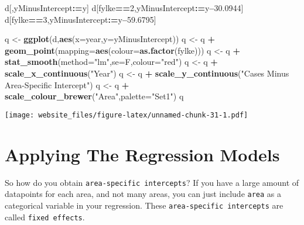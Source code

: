 \documentclass[]{book}
\newenvironment{Shaded}{\begin{snugshade}}{\end{snugshade}}
\newcommand{\KeywordTok}[1]{\textcolor[rgb]{0.13,0.29,0.53}{\textbf{#1}}}
\newcommand{\DataTypeTok}[1]{\textcolor[rgb]{0.13,0.29,0.53}{#1}}
\newcommand{\DecValTok}[1]{\textcolor[rgb]{0.00,0.00,0.81}{#1}}
\newcommand{\FloatTok}[1]{\textcolor[rgb]{0.00,0.00,0.81}{#1}}
\newcommand{\StringTok}[1]{\textcolor[rgb]{0.31,0.60,0.02}{#1}}
\newcommand{\OperatorTok}[1]{\textcolor[rgb]{0.81,0.36,0.00}{\textbf{#1}}}
\newcommand{\ErrorTok}[1]{\textcolor[rgb]{0.64,0.00,0.00}{\textbf{#1}}}
\newcommand{\NormalTok}[1]{#1}
\begin{document}
\begin{Shaded}
\begin{Highlighting}[]
\NormalTok{d[,yMinusIntercept}\OperatorTok{:}\ErrorTok{=}\NormalTok{y]}
\NormalTok{d[fylke}\OperatorTok{==}\DecValTok{2}\NormalTok{,yMinusIntercept}\OperatorTok{:}\ErrorTok{=}\NormalTok{y}\OperatorTok{--}\FloatTok{30.0944}\NormalTok{]}
\NormalTok{d[fylke}\OperatorTok{==}\DecValTok{3}\NormalTok{,yMinusIntercept}\OperatorTok{:}\ErrorTok{=}\NormalTok{y}\OperatorTok{--}\FloatTok{59.6795}\NormalTok{]}

\NormalTok{q <-}\StringTok{ }\KeywordTok{ggplot}\NormalTok{(d,}\KeywordTok{aes}\NormalTok{(}\DataTypeTok{x=}\NormalTok{year,}\DataTypeTok{y=}\NormalTok{yMinusIntercept))}
\NormalTok{q <-}\StringTok{ }\NormalTok{q }\OperatorTok{+}\StringTok{ }\KeywordTok{geom_point}\NormalTok{(}\DataTypeTok{mapping=}\KeywordTok{aes}\NormalTok{(}\DataTypeTok{colour=}\KeywordTok{as.factor}\NormalTok{(fylke)))}
\NormalTok{q <-}\StringTok{ }\NormalTok{q }\OperatorTok{+}\StringTok{ }\KeywordTok{stat_smooth}\NormalTok{(}\DataTypeTok{method=}\StringTok{"lm"}\NormalTok{,}\DataTypeTok{se=}\NormalTok{F,}\DataTypeTok{colour=}\StringTok{"red"}\NormalTok{)}
\NormalTok{q <-}\StringTok{ }\NormalTok{q }\OperatorTok{+}\StringTok{ }\KeywordTok{scale_x_continuous}\NormalTok{(}\StringTok{"Year"}\NormalTok{)}
\NormalTok{q <-}\StringTok{ }\NormalTok{q }\OperatorTok{+}\StringTok{ }\KeywordTok{scale_y_continuous}\NormalTok{(}\StringTok{"Cases Minus Area-Specific Intercept"}\NormalTok{)}
\NormalTok{q <-}\StringTok{ }\NormalTok{q }\OperatorTok{+}\StringTok{ }\KeywordTok{scale_colour_brewer}\NormalTok{(}\StringTok{"Area"}\NormalTok{,}\DataTypeTok{palette=}\StringTok{"Set1"}\NormalTok{)}
\NormalTok{q}
\end{Highlighting}
\end{Shaded}

\texttt{[image: website\_files/figure-latex/unnamed-chunk-31-1.pdf]}

\section{Applying The Regression
Models}\label{applying-the-regression-models}

So how do you obtain \texttt{area-specific\ intercepts}? If you have a
large amount of datapoints for each area, and not many areas, you can
just include \texttt{area} as a categorical variable in your regression.
These \texttt{area-specific\ intercepts} are called
\texttt{fixed\ effects}.
\end{document}
